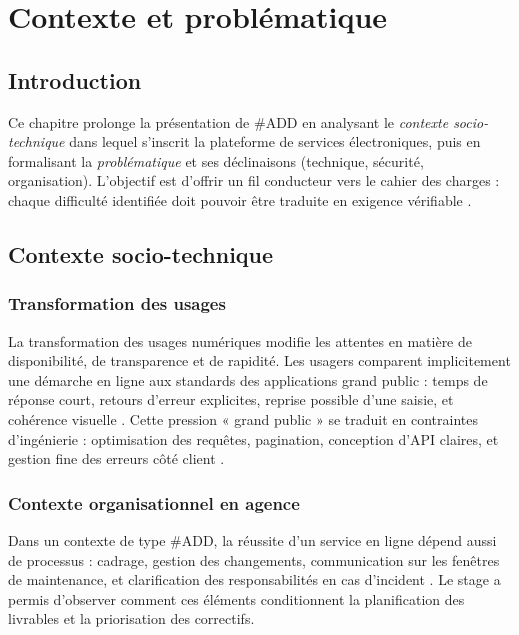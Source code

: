\chapter{Contexte et problématique}
\label{chap:contexte}

\section{Introduction}

Ce chapitre prolonge la présentation de \#ADD en analysant le \emph{contexte socio-technique} dans lequel s'inscrit la plateforme de services électroniques, puis en formalisant la \emph{problématique} et ses déclinaisons (technique, sécurité, organisation). L'objectif est d'offrir un fil conducteur vers le cahier des charges : chaque difficulté identifiée doit pouvoir être traduite en exigence vérifiable \cite{sommerville2016,iso25010}.

\section{Contexte socio-technique}

\subsection{Transformation des usages}

La transformation des usages numériques modifie les attentes en matière de disponibilité, de transparence et de rapidité. Les usagers comparent implicitement une démarche en ligne aux standards des applications grand public : temps de réponse court, retours d'erreur explicites, reprise possible d'une saisie, et cohérence visuelle \cite{pressman2014}. Cette pression « grand public » se traduit en contraintes d'ingénierie : optimisation des requêtes, pagination, conception d'API claires, et gestion fine des erreurs côté client \cite{rfc7231,fielding2000}.

\subsection{Contexte organisationnel en agence}

Dans un contexte de type \#ADD, la réussite d'un service en ligne dépend aussi de processus : cadrage, gestion des changements, communication sur les fenêtres de maintenance, et clarification des responsabilités en cas d'incident \cite{bass2021}. Le stage a permis d'observer comment ces éléments conditionnent la planification des livrables et la priorisation des correctifs.

